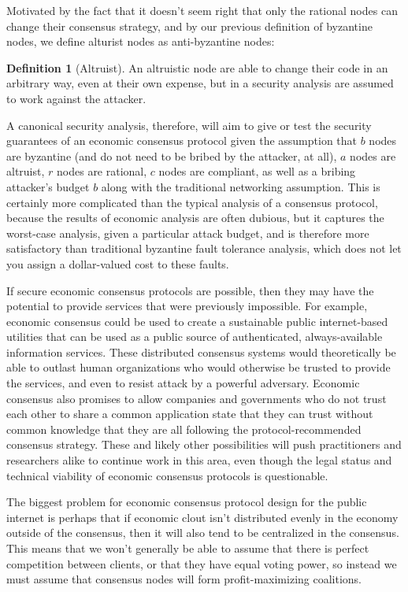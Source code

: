 \documentclass[11pt,a4paper]{article}
\theoremstyle{plain}
\theoremstyle{definition}
\newtheorem{defn}{Definition}
\begin{document}
Motivated by the fact that it doesn't seem right that only the rational nodes can change their consensus strategy, and by our previous definition of byzantine nodes, we define alturist nodes as anti-byzantine nodes:

\begin{defn}[Altruist]
An altruistic node are able to change their code in an arbitrary way, even at their own expense, but in a security analysis are assumed to work against the attacker.
\end{defn}

A canonical security analysis, therefore, will aim to give or test the security guarantees of an economic consensus protocol given the assumption that $b$ nodes are byzantine (and do not need to be bribed by the attacker, at all), $a$ nodes are altruist, $r$ nodes are rational, $c$ nodes are compliant, as well as a bribing attacker's budget $b$ along with the traditional networking assumption. This is certainly more complicated than the typical analysis of a consensus protocol, because the results of economic analysis are often dubious, but it captures the worst-case analysis, given a particular attack budget, and is therefore more satisfactory than traditional byzantine fault tolerance analysis, which does not let you assign a dollar-valued cost to these faults. 

If secure economic consensus protocols are possible, then they may have the potential to provide services that were previously impossible. For example, economic consensus could be used to create a sustainable public internet-based utilities that can be used as a public source of authenticated, always-available information services. 
These distributed consensus systems would theoretically be able to outlast human organizations who would otherwise be trusted to provide the services, and even to resist attack by a powerful adversary. Economic consensus also promises to allow companies and governments who do not trust each other to share a common application state that they can trust without common knowledge that they are all following the protocol-recommended consensus strategy. These and likely other possibilities will push practitioners and researchers alike to continue work in this area, even though the legal status and technical viability of economic consensus protocols is questionable.

The biggest problem for economic consensus protocol design for the public internet is perhaps that if economic clout isn't distributed evenly in the economy outside of the consensus, then it will also tend to be centralized in the consensus. This means that we won't generally be able to assume that there is perfect competition between clients, or that they have equal voting power, so instead we must assume that consensus nodes will form profit-maximizing coalitions.
\end{document}

